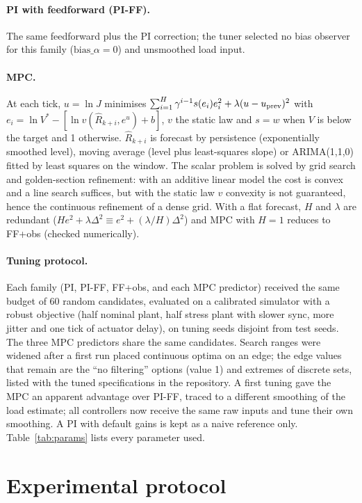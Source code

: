 \documentclass[smallextended]{svjour3}
\begin{document}
\paragraph{PI with feedforward (PI-FF).} The same feedforward plus the PI correction; the tuner selected no bias observer for this family ($\text{bias}\_\alpha=0$) and unsmoothed load input.
\paragraph{MPC.} At each tick, $u=\ln J$ minimises $\sum_{i=1}^{H}\gamma^{i-1}s(e_i)e_i^2+\lambda(u-u_{\rm prev})^2$ with
$e_i=\ln V^*-[\ln v(\hat R_{k+i},e^{u})+b]$, $v$ the static law and $s=w$ when $V$ is below the target and 1 otherwise. $\hat R_{k+i}$ is
forecast by persistence (exponentially smoothed level), moving average (level plus least-squares slope) or ARIMA(1,1,0) fitted by least squares on the
window. The scalar problem is solved by grid search and golden-section refinement: with an additive linear model the cost is convex and a line search suffices, but with the static law $v$ convexity is not guaranteed, hence the continuous refinement of a dense grid. With a flat forecast, $H$ and $\lambda$ are redundant
($H e^2+\lambda\Delta^2 \equiv e^2+(\lambda/H)\Delta^2$) and MPC with $H=1$ reduces to FF+obs (checked numerically).

\paragraph{Tuning protocol.}
Each family (PI, PI-FF, FF+obs, and each MPC predictor) received the same budget of 60 random candidates, evaluated on a
calibrated simulator with a robust objective (half nominal plant, half stress plant with slower sync, more jitter and one tick of actuator delay),
on tuning seeds disjoint from test seeds. The three MPC predictors share the same candidates. Search ranges were widened after a first run placed continuous optima on an edge; the edge values that remain are the ``no filtering'' options (value 1) and extremes of discrete sets, listed with the tuned specifications in the repository. A first tuning gave the MPC an apparent advantage over PI-FF, traced to a different smoothing of the load estimate;
all controllers now receive the same raw inputs and tune their own smoothing. A PI with default gains is kept as a naive reference only. Table~\ref{tab:params} lists every parameter used.


\section{Experimental protocol}\label{sec:protocol}
\end{document}

